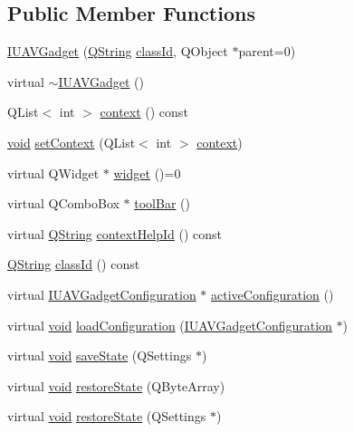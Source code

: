 \subsection*{\-Public \-Member \-Functions}
\begin{DoxyCompactItemize}
\item 
\hyperlink{group___core_plugin_gab05dd4230eb4f599db6c08439bc6216c}{\-I\-U\-A\-V\-Gadget} (\hyperlink{group___u_a_v_objects_plugin_gab9d252f49c333c94a72f97ce3105a32d}{\-Q\-String} \hyperlink{group___core_plugin_ga3878fde66a57220608960bcc3fbeef2c}{class\-Id}, \-Q\-Object $\ast$parent=0)
\item 
virtual \hyperlink{group___core_plugin_ga817ce9cba005f49f5da1d0e5daca2fa4}{$\sim$\-I\-U\-A\-V\-Gadget} ()
\item 
\-Q\-List$<$ int $>$ \hyperlink{group___core_plugin_gaaed028d1293022d86c3ccba4c1d3c4e7}{context} () const 
\item 
\hyperlink{group___u_a_v_objects_plugin_ga444cf2ff3f0ecbe028adce838d373f5c}{void} \hyperlink{group___core_plugin_ga90502d49b96520b41d1f55429144cb74}{set\-Context} (\-Q\-List$<$ int $>$ \hyperlink{group___core_plugin_gaaed028d1293022d86c3ccba4c1d3c4e7}{context})
\item 
virtual \-Q\-Widget $\ast$ \hyperlink{group___core_plugin_gac74c76eef51e24e62a333fe0fd940cf6}{widget} ()=0
\item 
virtual \-Q\-Combo\-Box $\ast$ \hyperlink{group___core_plugin_ga96a26c85897a679529b1fc59d8c0edcd}{tool\-Bar} ()
\item 
virtual \hyperlink{group___u_a_v_objects_plugin_gab9d252f49c333c94a72f97ce3105a32d}{\-Q\-String} \hyperlink{group___core_plugin_ga27d0b6b967ad954602eb54eecc5dbdd1}{context\-Help\-Id} () const 
\item 
\hyperlink{group___u_a_v_objects_plugin_gab9d252f49c333c94a72f97ce3105a32d}{\-Q\-String} \hyperlink{group___core_plugin_ga3878fde66a57220608960bcc3fbeef2c}{class\-Id} () const 
\item 
virtual \hyperlink{class_core_1_1_i_u_a_v_gadget_configuration}{\-I\-U\-A\-V\-Gadget\-Configuration} $\ast$ \hyperlink{group___core_plugin_gaae57a0547d1a44549001909d0f3d8ccc}{active\-Configuration} ()
\item 
virtual \hyperlink{group___u_a_v_objects_plugin_ga444cf2ff3f0ecbe028adce838d373f5c}{void} \hyperlink{group___core_plugin_gaaf60a82b8643f54a42381600c52bbe8a}{load\-Configuration} (\hyperlink{class_core_1_1_i_u_a_v_gadget_configuration}{\-I\-U\-A\-V\-Gadget\-Configuration} $\ast$)
\item 
virtual \hyperlink{group___u_a_v_objects_plugin_ga444cf2ff3f0ecbe028adce838d373f5c}{void} \hyperlink{group___core_plugin_ga9759b09853e66682145bff354bbc67a2}{save\-State} (\-Q\-Settings $\ast$)
\item 
virtual \hyperlink{group___u_a_v_objects_plugin_ga444cf2ff3f0ecbe028adce838d373f5c}{void} \hyperlink{group___core_plugin_ga5dd9e50dd4b774c9629db1253b996b40}{restore\-State} (\-Q\-Byte\-Array)
\item 
virtual \hyperlink{group___u_a_v_objects_plugin_ga444cf2ff3f0ecbe028adce838d373f5c}{void} \hyperlink{group___core_plugin_ga33f4d9ab2eb15e1a3f70729c67ebc6e2}{restore\-State} (\-Q\-Settings $\ast$)
\end{DoxyCompactItemize}
